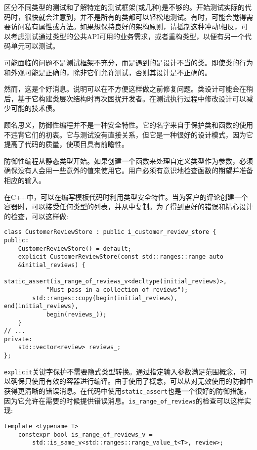 
区分不同类型的测试和了解特定的测试框架(或几种)是不够的。开始测试实际的代码时，很快就会注意到，并不是所有的类都可以轻松地测试。有时，可能会觉得需要访问私有属性或方法。如果想保持良好的架构原则，请抵制这种冲动!相反，可以考虑测试通过类型的公共API可用的业务需求，或者重构类型，以便有另一个代码单元可以测试。


可能面临的问题不是测试框架不充分，而是遇到的是设计不当的类。即使类的行为和外观可能是正确的，除非它们允许测试，否则其设计是不正确的。

然而，这是个好消息。说明可以在不方便这样做之前修复问题。类设计可能会在稍后，基于它构建类层次结构时再次困扰开发者。在测试执行过程中修改设计可以减少可能的技术债。


顾名思义，防御性编程并不是一种安全特性。它的名字来自于保护类和函数的使用不违背它们的初衷。它与测试没有直接关系，但它是一种很好的设计模式，因为它提高了代码的质量，使项目具有前瞻性。

防御性编程从静态类型开始。如果创建一个函数来处理自定义类型作为参数，必须确保没有人会用一些意外的值来使用它。用户必须有意识地检查函数的期望并准备相应的输入。

在C++中，可以在编写模板代码时利用类型安全特性。当为客户的评论创建一个容器时，可以接受任何类型的列表，并从中复制。为了得到更好的错误和精心设计的检查，可以这样做:

\begin{lstlisting}[style=styleCXX]
class CustomerReviewStore : public i_customer_review_store {
public:
	CustomerReviewStore() = default;
	explicit CustomerReviewStore(const std::ranges::range auto
	&initial_reviews) {
		static_assert(is_range_of_reviews_v<decltype(initial_reviews)>,
			"Must pass in a collection of reviews");
		std::ranges::copy(begin(initial_reviews), end(initial_reviews),
			begin(reviews_));
	}
// ...
private:
	std::vector<review> reviews_;
};
\end{lstlisting}

\texttt{explicit}关键字保护不需要隐式类型转换。通过指定输入参数满足范围概念，可以确保只使用有效的容器进行编译。由于使用了概念，可以从对无效使用的防御中获得更清晰的错误消息。在代码中使用\texttt{static\_assert}也是一个很好的防御措施，因为它允许在需要的时候提供错误消息。\texttt{is\_range\_of\_reviews}的检查可以这样实现:

\begin{lstlisting}[style=styleCXX]
template <typename T>
	constexpr bool is_range_of_reviews_v =
		std::is_same_v<std::ranges::range_value_t<T>, review>;
\end{lstlisting}

